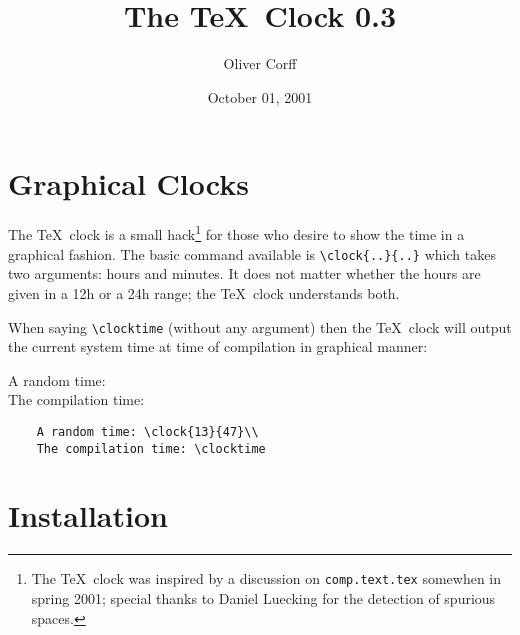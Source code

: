 \documentclass[12pt]{ltxdoc}
\title{{\bigclockfont\clock{10}{10}}\\[0.5cm]
	The \TeX\ Clock 0.3}
\author{Oliver Corff}
\date{October 01, 2001}
\newcommand\exa{\nopagebreak \begin{flushleft}\smallskip \nopagebreak
                \begin{minipage}[t]{6cm}\sloppy}
\newcommand\exb{\end{minipage}\kern 1cm\begin{minipage}[t]{8cm}\sloppy }
\newcommand\exc{\end{minipage}\kern -3cm \smallskip\end{flushleft}}
\begin{document}
\maketitle


\section{Graphical Clocks}

The \TeX\ clock is a small hack\footnote{%
	The \TeX\ clock was inspired by a discussion on
	\texttt{comp.text.tex} somewhen in spring 2001;
	special thanks to Daniel Luecking for the detection
	of spurious spaces.} 
for those who desire to show the time
in a graphical fashion. The basic command available is
\verb-\clock{..}{..}- which takes two arguments: hours and minutes. It
does not matter whether the hours are given in a 12h or a 24h range;
the \TeX\ clock understands both.

When saying \verb-\clocktime- (without any argument) then the \TeX\ clock
will output the current system time at time of compilation in graphical
manner: 


\exa
	A random time: \\
	The compilation time: \clocktime
\exb
	\begin{verbatim}
	A random time: \clock{13}{47}\\
	The compilation time: \clocktime
	\end{verbatim}
\exc


\section{Installation}
\end{document}
